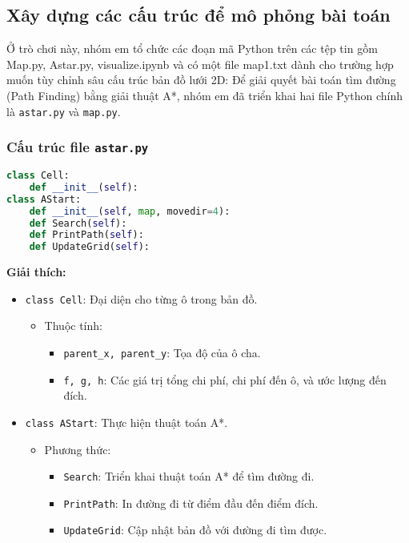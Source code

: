 \subsection{Xây dựng các cấu trúc để mô phỏng bài toán}
Ở trò chơi này, nhóm em tổ chức các đoạn mã Python trên các tệp tin gồm Map.py, Astar.py, visualize.ipynb và có một file map1.txt dành cho trường hợp muốn tùy chỉnh sâu cấu trúc bản đồ lưới 2D:
Để giải quyết bài toán tìm đường (Path Finding) bằng giải thuật A*, nhóm em đã triển khai hai file Python chính là \texttt{astar.py} và \texttt{map.py}. 

\subsubsection{Cấu trúc file \texttt{astar.py}}
\begin{lstlisting}[language=python, caption=Định nghĩa các lớp trong file astar.py]
class Cell:
    def __init__(self):
class AStart:
    def __init__(self, map, movedir=4):
    def Search(self):
    def PrintPath(self):
    def UpdateGrid(self):
\end{lstlisting}

\textbf{Giải thích:}
\begin{itemize}
    \item \texttt{class Cell}: Đại diện cho từng ô trong bản đồ.
    \begin{itemize}
        \item Thuộc tính:
        \begin{itemize}
            \item \texttt{parent\_x, parent\_y}: Tọa độ của ô cha.
            \item \texttt{f, g, h}: Các giá trị tổng chi phí, chi phí đến ô, và ước lượng đến đích.
        \end{itemize}
    \end{itemize}
    \item \texttt{class AStart}: Thực hiện thuật toán A*.
    \begin{itemize}
        \item Phương thức:
        \begin{itemize}
            \item \texttt{Search}: Triển khai thuật toán A* để tìm đường đi.
            \item \texttt{PrintPath}: In đường đi từ điểm đầu đến điểm đích.
            \item \texttt{UpdateGrid}: Cập nhật bản đồ với đường đi tìm được.
        \end{itemize}
    \end{itemize}
\end{itemize}

